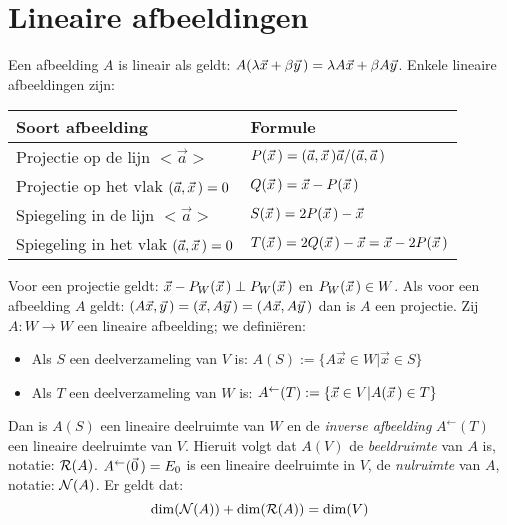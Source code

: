 \section{Lineaire afbeeldingen}
Een afbeelding $A$ is lineair als geldt:
$A(\lambda\vec{x}+\beta\vec{y}\,)=\lambda A\vec{x}+\beta A\vec{y}$.
\npar
Enkele lineaire afbeeldingen zijn:
\begin{center}
\begin{tabular}{||p{7cm}|p{6cm}||}
\hline
\bf Soort afbeelding&\bf Formule\\
\hline
\hline
Projectie op de lijn $<\vec{a}>$              &$P(\vec{x}\,)=(\vec{a},\vec{x}\,)\vec{a}/(\vec{a},\vec{a}\,)$\\
Projectie op het vlak $(\vec{a},\vec{x}\,)=0$ &$Q(\vec{x}\,)=\vec{x}-P(\vec{x}\,)$\\
Spiegeling in de lijn $<\vec{a}>$             &$S(\vec{x}\,)=2P(\vec{x}\,)-\vec{x}$\\
Spiegeling in het vlak $(\vec{a},\vec{x}\,)=0$&$T(\vec{x}\,)=2Q(\vec{x}\,)-\vec{x}=\vec{x}-2P(\vec{x}\,)$\\
\hline
\end{tabular}
\end{center}
Voor een projectie geldt: $\vec{x}-P_W(\vec{x}\,)\perp P_W(\vec{x}\,)$ en
$P_W(\vec{x}\,)\in W$.
\npar
Als voor een afbeelding $A$ geldt: $(A\vec{x},\vec{y}\,)=(\vec{x},A\vec{y}\,)=(A\vec{x},A\vec{y}\,)$
dan is $A$ een projectie.
\npar
Zij $A:W\rightarrow W$ een lineaire afbeelding; we defini\"eren:
\begin{itemize}
\item Als $S$ een deelverzameling van $V$ is: $A(S):=\{A\vec{x}\in W|\vec{x}\in S\}$
\item Als $T$ een deelverzameling van $W$ is: $A^\leftarrow(T):=\{\vec{x}\in V|A(\vec{x}\,)\in T\}$
\end{itemize}
Dan is $A(S)$ een lineaire deelruimte van $W$ en de {\it inverse afbeelding}
$A^\leftarrow(T)$ een lineaire deelruimte van $V$. Hieruit volgt dat $A(V)$ de
{\it beeldruimte} van $A$ is, notatie: ${\cal R}(A)$. $A^\leftarrow(\vec{0}\,)=E_0$
is een lineaire deelruimte in $V$, de {\it nulruimte} van $A$, notatie:
${\cal N}(A)$.  Er geldt dat:
\[
{\rm dim}({\cal N}(A))+{\rm dim}({\cal R}(A))={\rm dim}(V)
\]

